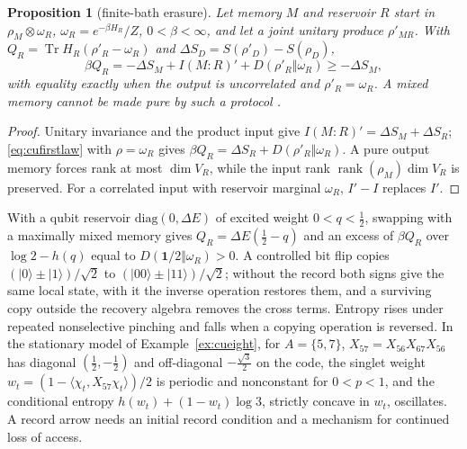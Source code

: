 \documentclass[aps,pra,onecolumn,superscriptaddress,nofootinbib,10pt]{revtex4-2}
\newtheorem{proposition}[theorem]{Proposition}
\theoremstyle{definition}
\theoremstyle{remark}
\newcommand{\rk}{\operatorname{rank}}
\newcommand{\tr}{\operatorname{Tr}}
\newcommand{\ip}[2]{\langle #1,#2\rangle}
\begin{document}
\begin{proposition}[finite-bath erasure]\label{prop:culandauer}
Let memory $M$ and reservoir $R$ start in $\rho_M\otimes\omega_R$, $\omega_R=e^{-\beta H_R}/Z$, $0<\beta<\infty$, and let a joint unitary produce $\rho'_{MR}$.
With $Q_R=\tr H_R(\rho'_R-\omega_R)$ and $\Delta S_D=S(\rho'_D)-S(\rho_D)$,
\[
\beta Q_R=-\Delta S_M+I(M{:}R)'+D(\rho'_R\Vert\omega_R)\ge-\Delta S_M ,
\]
with equality exactly when the output is uncorrelated and $\rho'_R=\omega_R$.  A mixed memory cannot be made pure by
such a protocol \cite{n1-landauer,n1-reeb}.
\end{proposition}
\begin{proof}
Unitary invariance and the product input give $I(M{:}R)'=\Delta S_M+\Delta S_R$; \eqref{eq:cufirstlaw} with $\rho=\omega_R$ gives
$\beta Q_R=\Delta S_R+D(\rho'_R\Vert\omega_R)$.  A pure output memory forces rank at most $\dim V_R$, while the input rank
$\rk(\rho_M)\dim V_R$ is preserved.  For a correlated input with reservoir marginal $\omega_R$, $I'-I$ replaces $I'$.
\end{proof}
\noindent With a qubit reservoir $\mathrm{diag}(0,\Delta E)$ of excited weight $0<q<\tfrac12$, swapping with a maximally mixed memory
gives $Q_R=\Delta E(\tfrac12-q)$ and an excess of $\beta Q_R$ over $\log2-h(q)$ equal to $D(\mathbf1/2\Vert\omega_R)>0$.  A controlled bit flip
copies $(\lvert0\rangle\pm\lvert1\rangle)/\sqrt2$ to $(\lvert00\rangle\pm\lvert11\rangle)/\sqrt2$; without the record both signs give the same local state, with it the
inverse operation restores them, and a surviving copy outside the recovery algebra removes the cross
terms.  Entropy rises under repeated nonselective pinching and falls when a copying operation is
reversed.  In the stationary model of Example~\ref{ex:cueight}, for $A=\{5,7\}$, $X_{57}=X_{56}X_{67}X_{56}$ has diagonal $(\tfrac12,-\tfrac12)$ and
off-diagonal $-\tfrac{\sqrt3}2$ on the code, the singlet weight $w_t=(1-\ip{\chi_t}{X_{57}\chi_t})/2$ is periodic and nonconstant for $0<p<1$,
and the conditional entropy $h(w_t)+(1-w_t)\log3$, strictly concave in $w_t$, oscillates.  A record arrow needs an
initial record condition and a mechanism for continued loss of access.
\end{document}

